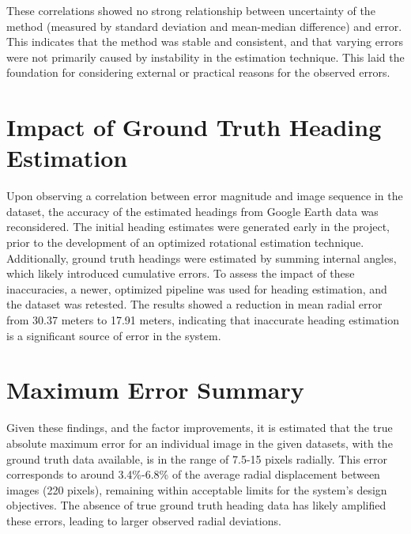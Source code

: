 These correlations showed no strong relationship between uncertainty of the method (measured by standard deviation and mean-median difference) and error. This indicates that the method was stable and consistent, and that varying errors were not primarily caused by instability in the estimation technique. This laid the foundation for considering external or practical reasons for the observed errors.

\section{Impact of Ground Truth Heading Estimation}

Upon observing a correlation between error magnitude and image sequence in the dataset, the accuracy of the estimated headings from Google Earth data was reconsidered. The initial heading estimates were generated early in the project, prior to the development of an optimized rotational estimation technique. Additionally, ground truth headings were estimated by summing internal angles, which likely introduced cumulative errors. To assess the impact of these inaccuracies, a newer, optimized pipeline was used for heading estimation, and the dataset was retested. The results showed a reduction in mean radial error from 30.37 meters to 17.91 meters, indicating that inaccurate heading estimation is a significant source of error in the system.

\section{Maximum Error Summary}

Given these findings, and the factor improvements, it is estimated that the true absolute maximum error for an individual image in the given datasets, with the ground truth data available, is in the range of 7.5-15 pixels radially. This error corresponds to around 3.4\%-6.8\% of the average radial displacement between images (220 pixels), remaining within acceptable limits for the system's design objectives. The absence of true ground truth heading data has likely amplified these errors, leading to larger observed radial deviations.
















